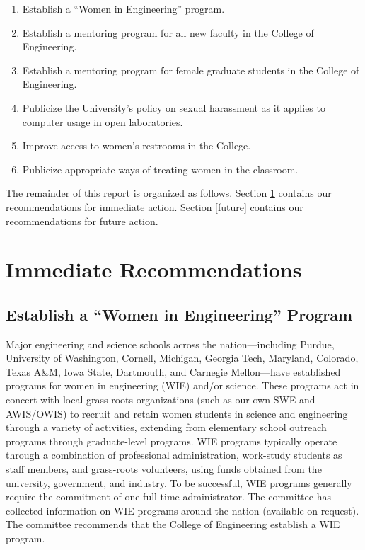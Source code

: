\begin{enumerate}

\item Establish a ``Women in Engineering'' program.

\item Establish a mentoring program for all new faculty in the
College of Engineering.

\item Establish a mentoring program for female graduate students in
the College of Engineering.

\item Publicize the University's policy on sexual harassment as
it applies to computer usage in open laboratories.

\item Improve access to women's restrooms in the College.

\item Publicize appropriate ways of treating women in the classroom.

\end{enumerate}

The remainder of this report is organized as follows.
Section \ref{immediate} contains our recommendations for immediate
action.
Section \ref{future} contains our recommendations for future action.

\section{Immediate Recommendations}
\label{immediate}

\subsection{Establish a ``Women in Engineering'' Program}

Major engineering and science schools across the nation---including
Purdue, University of Washington, Cornell, Michigan, Georgia Tech,
Maryland, Colorado, Texas A\&M, Iowa State, Dartmouth,
and Carnegie Mellon---have 
established programs for women in engineering (WIE) and/or
science.
These programs act in concert with local grass-roots organizations
(such as our own SWE and AWIS/OWIS) to recruit and retain women
students in science and engineering through a variety of activities,
 extending from elementary school outreach programs through
graduate-level programs.
WIE programs typically operate through a combination of professional
administration, work-study students as staff
members, and grass-roots volunteers, using funds obtained from
the university, government, and industry.
 To be successful,
WIE programs generally require the commitment
of one full-time administrator.
The committee has collected information on WIE programs around
the nation (available on request).
The committee recommends that the College of Engineering
establish a WIE program. 

